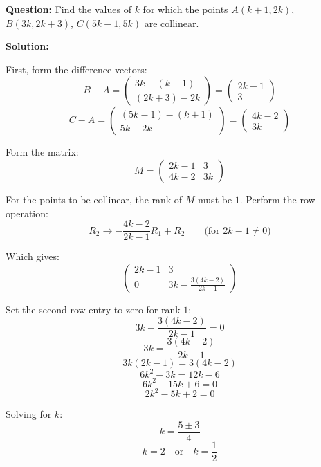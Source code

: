 \documentclass[journal]{IEEEtran}
\begin{document}
\textbf{Question:} 
Find the values of $k$ for which the points $A(k+1, 2k)$, $B(3k, 2k+3)$, $C(5k-1, 5k)$ are collinear. 
\vspace{0.5cm}

\textbf{Solution:}

First, form the difference vectors:
\[
 B - A = 
\begin{pmatrix}
3k - (k+1) \\ (2k+3) - 2k
\end{pmatrix}
=
\begin{pmatrix}
2k - 1 \\ 3
\end{pmatrix}
\]
\[
  C - A =
\begin{pmatrix}
(5k-1) - (k+1) \\ 5k - 2k
\end{pmatrix}
=
\begin{pmatrix}
4k - 2 \\ 3k
\end{pmatrix}
\]

Form the matrix:
\[
M = \begin{pmatrix}
2k-1 & 3 \\
4k-2 & 3k
\end{pmatrix}
\]

For the points to be collinear, the rank of $M$ must be $1$. Perform the row operation:
\[
R_2 \to -\frac{4k-2}{2k-1}R_1 + R_2 \qquad \text{(for $2k-1 \neq 0$)}
\]

Which gives:
\[
\begin{pmatrix}
2k-1 & 3 \\
0 & 3k - \frac{3(4k-2)}{2k-1}
\end{pmatrix}
\]

Set the second row entry to zero for rank $1$:
\[
3k - \frac{3(4k-2)}{2k-1} = 0
\]
\[
3k = \frac{3(4k-2)}{2k-1}
\]
\[
3k(2k-1) = 3(4k-2)
\]
\[
6k^2 - 3k = 12k - 6
\]
\[
6k^2 - 15k + 6 = 0
\]
\[
2k^2 - 5k + 2 = 0
\]

Solving for $k$:
\[
k = \frac{5 \pm 3}{4}
\]
\[
k = 2 \quad \text{or} \quad k = \frac{1}{2}
\]
\end{document}
